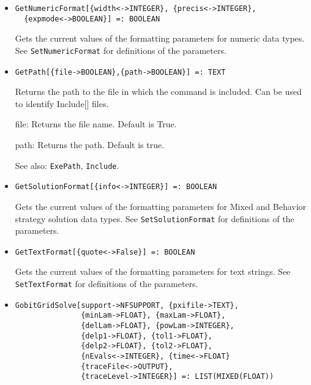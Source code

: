 \begin{itemize}
\item{}
\protect \large \begin{verbatim}
GetNumericFormat[{width<->INTEGER}, {precis<->INTEGER}, 
  {expmode<->BOOLEAN}] =: BOOLEAN 
\end{verbatim} \normalsize

\bd 
Gets the current values of the formatting parameters for numeric
data types.  See \verb+SetNumericFormat+ for definitions of the
parameters.  
\ed

\item{}
\protect \large \begin{verbatim}
GetPath[{file->BOOLEAN},{path->BOOLEAN}] =: TEXT 
\end{verbatim} \normalsize

\bd
Returns the path to the file in which the command is included.  Can be
used to identify Include[] files. 
\bd
\item [file:] Returns the file name.  Default is True.  
\item [path:] Returns the path.  Default is true. 
\ed
\item [See also:] \verb+ExePath+, \verb+Include+.
\ed

\item{}
\protect \large \begin{verbatim}
GetSolutionFormat[{info<->INTEGER}] =: BOOLEAN 
\end{verbatim} \normalsize

\bd
Gets the current values of the formatting parameters for Mixed and
Behavior strategy solution data types.  See \verb+SetSolutionFormat+ for
definitions of the parameters.  
\ed

\item{}
\protect \large \begin{verbatim}
GetTextFormat[{quote<->False}] =: BOOLEAN 
\end{verbatim} \normalsize

\bd
Gets the current values of the formatting parameters for text strings.  See
\verb+SetTextFormat+ for definitions of the parameters. 
\ed

\item{}
\protect \large \begin{verbatim}
GobitGridSolve[support->NFSUPPORT, {pxifile->TEXT},
               {minLam->FLOAT}, {maxLam->FLOAT}, 
               {delLam->FLOAT}, {powLam->INTEGER}, 
               {delp1->FLOAT}, {tol1->FLOAT},
               {delp2->FLOAT}, {tol2->FLOAT},
               {nEvals<->INTEGER}, {time<->FLOAT}
               {traceFile<->OUTPUT},
               {traceLevel->INTEGER}] =: LIST(MIXED(FLOAT))
\end{verbatim}\normalsize


\end{itemize}
